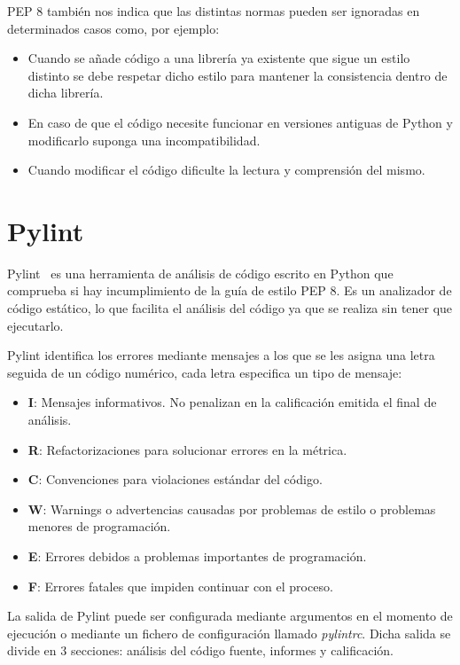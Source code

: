 \documentclass[a4paper, 12pt]{book}
\begin{document}
PEP 8 también nos indica que las distintas normas pueden ser ignoradas en determinados casos como, por ejemplo:
\begin{itemize}
	\item Cuando se añade código a una librería ya existente que sigue un estilo distinto se debe respetar dicho estilo para mantener la consistencia dentro de dicha librería.
	\item En caso de que el código necesite funcionar en versiones antiguas de Python y modificarlo suponga una incompatibilidad.
	\item Cuando modificar el código dificulte la lectura y comprensión del mismo. 
\end{itemize}

\section{Pylint} 
\label{sec:pylint}
Pylint~\cite{pylint} es una herramienta de análisis de código escrito en Python que comprueba si hay incumplimiento de la guía de estilo PEP 8. Es un analizador de código estático, lo que facilita el análisis del código ya que se realiza sin tener que ejecutarlo.

Pylint identifica los errores mediante mensajes a los que se les asigna una letra seguida de un código numérico, cada letra especifica un tipo de mensaje:
\begin{itemize}
	\item \textbf{I}: Mensajes informativos. No penalizan en la calificación emitida el final de análisis.
	\item \textbf{R}: Refactorizaciones para solucionar errores en la métrica.
	\item \textbf{C}: Convenciones para violaciones estándar del código.
	\item \textbf{W}: Warnings o advertencias causadas por problemas de estilo o problemas menores de programación.
	\item \textbf{E}: Errores debidos a problemas importantes de programación.
	\item \textbf{F}: Errores fatales que impiden continuar con el proceso.
\end{itemize}

La salida de Pylint puede ser configurada mediante argumentos en el momento de ejecución o mediante un fichero de configuración llamado \textit{pylintrc}.
Dicha salida se divide en 3 secciones: análisis del código fuente, informes y calificación.
\end{document}
